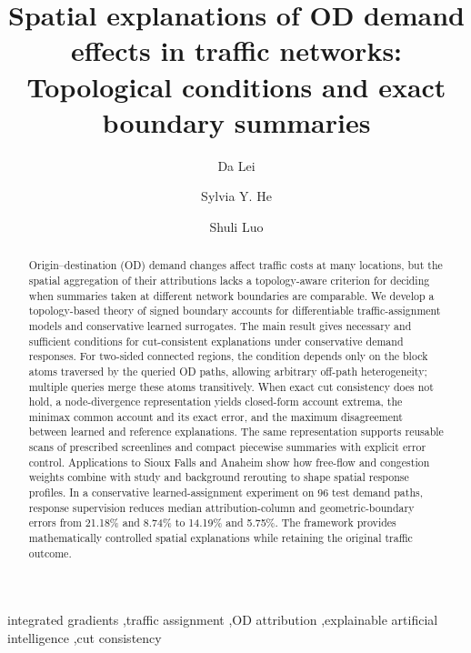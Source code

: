 \documentclass[a4paper,fleqn]{cas-sc}
\begin{document}
\title[mode=title]{Spatial explanations of OD demand effects in traffic networks: Topological conditions and exact boundary summaries}
\author[1]{Da Lei}
\author[2]{Sylvia Y. He}
\cormark[1]
\author[3]{Shuli Luo}
\begin{abstract}
Origin--destination (OD) demand changes affect traffic costs at many locations, but the spatial aggregation of their attributions lacks a topology-aware criterion for deciding when summaries taken at different network boundaries are comparable. We develop a topology-based theory of signed boundary accounts for differentiable traffic-assignment models and conservative learned surrogates. The main result gives necessary and sufficient conditions for cut-consistent explanations under conservative demand responses. For two-sided connected regions, the condition depends only on the block atoms traversed by the queried OD paths, allowing arbitrary off-path heterogeneity; multiple queries merge these atoms transitively. When exact cut consistency does not hold, a node-divergence representation yields closed-form account extrema, the minimax common account and its exact error, and the maximum disagreement between learned and reference explanations. The same representation supports reusable scans of prescribed screenlines and compact piecewise summaries with explicit error control. Applications to Sioux Falls and Anaheim show how free-flow and congestion weights combine with study and background rerouting to shape spatial response profiles. In a conservative learned-assignment experiment on 96 test demand paths, response supervision reduces median attribution-column and geometric-boundary errors from 21.18\% and 8.74\% to 14.19\% and 5.75\%. The framework provides mathematically controlled spatial explanations while retaining the original traffic outcome.
\end{abstract}
\begin{keywords}
integrated gradients \sep traffic assignment \sep OD attribution \sep explainable artificial intelligence \sep cut consistency
\end{keywords}
\maketitle
{}
\end{document}
